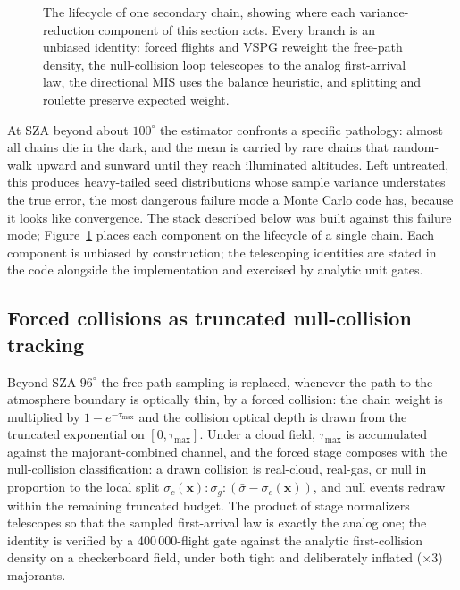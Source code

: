 \documentclass[preprint,12pt]{elsarticle}
\begin{document}
\begin{figure}[t]
\caption{The lifecycle of one secondary chain, showing where each
variance-reduction component of this section acts. Every branch is an
unbiased identity: forced flights and VSPG reweight the free-path
density, the null-collision loop telescopes to the analog
first-arrival law, the directional MIS uses the balance heuristic,
and splitting and roulette preserve expected weight.}
\label{fig:lifecycle}
\end{figure}

At SZA beyond about $100^\circ$ the estimator confronts a specific
pathology: almost all chains die in the dark, and the mean is carried by
rare chains that random-walk upward and sunward until they reach
illuminated altitudes. Left untreated, this produces heavy-tailed seed
distributions whose sample variance understates the true error, the most
dangerous failure mode a Monte Carlo code has, because it looks like
convergence. The stack described below was built against this failure
mode; Figure~\ref{fig:lifecycle} places each component on the
lifecycle of a single chain. Each component is
unbiased by construction; the telescoping identities are stated in the
code alongside the implementation and exercised by analytic unit gates.

\subsection{Forced collisions as truncated null-collision tracking}
\label{sec:forced}

Beyond SZA $96^\circ$ the free-path sampling is replaced, whenever the
path to the atmosphere boundary is optically thin, by a forced collision:
the chain weight is multiplied by $1 - e^{-\tau_{\max}}$ and the collision
optical depth is drawn from the truncated exponential on
$[0, \tau_{\max}]$. Under a cloud field, $\tau_{\max}$ is accumulated
against the majorant-combined channel, and the forced stage composes with
the null-collision classification: a drawn collision is real-cloud,
real-gas, or null in proportion to the local split
$\sigma_c(\mathbf{x}) : \sigma_g : (\bar\sigma - \sigma_c(\mathbf{x}))$,
and null events redraw within the remaining truncated budget. The product
of stage normalizers telescopes so that the sampled first-arrival law is
exactly the analog one; the identity is verified by a 400\,000-flight gate
against the analytic first-collision density on a checkerboard field,
under both tight and deliberately inflated ($\times 3$) majorants.
\end{document}
